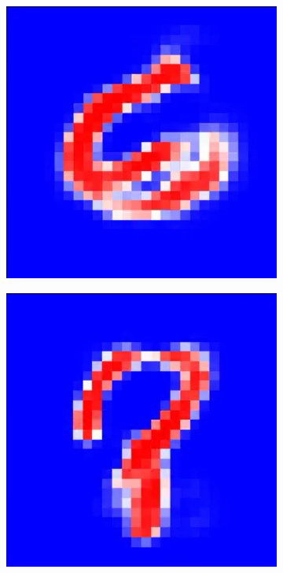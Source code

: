 \documentclass[a4paper]{article}
\begin{document}
\begin{figure}[ht]
\begin{subfigure}[b]{0.095\textwidth}
  \end{subfigure}
    \begin{subfigure}[b]{0.095\textwidth}
   \includegraphics[width=\linewidth]{figures/6.png}
  \end{subfigure}
    \begin{subfigure}[b]{0.095\textwidth}
   \includegraphics[width=\linewidth]{figures/7.png}

\end{subfigure}
\end{figure}
\end{document}
